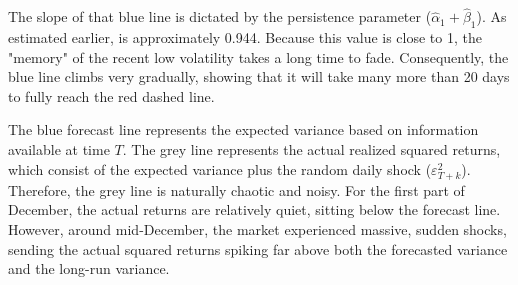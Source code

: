 \documentclass{article}
\begin{document}
\begin{enumerate}
    The slope of that blue line is dictated by the persistence parameter ($\hat{\alpha}_1 + \hat{\beta}_1$). As estimated earlier, is approximately 0.944. Because this value is close to 1, the "memory" of the recent low volatility takes a long time to fade. Consequently, the blue line climbs very gradually, showing that it will take many more than 20 days to fully reach the red dashed line. 
    
    The blue forecast line represents the expected variance based on information available at time $T$. The grey line represents the actual realized squared returns, which consist of the expected variance plus the random daily shock ($\varepsilon_{T+k}^2$). Therefore, the grey line is naturally chaotic and noisy. For the first part of December, the actual returns are relatively quiet, sitting below the forecast line. However, around mid-December, the market experienced massive, sudden shocks, sending the actual squared returns spiking far above both the forecasted variance and the long-run variance.
\end{enumerate}

\newpage
\end{document}
